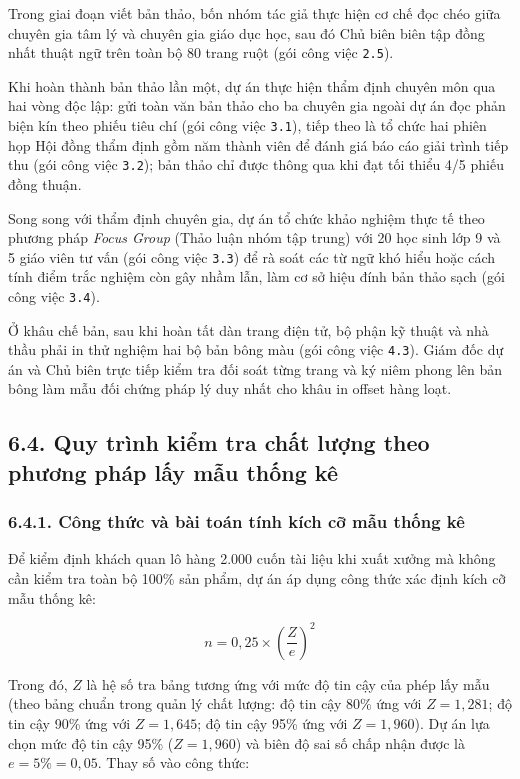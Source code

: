 Trong giai đoạn viết bản thảo, bốn nhóm tác giả thực hiện cơ chế đọc chéo giữa chuyên gia tâm lý và chuyên gia giáo dục học, sau đó Chủ biên biên tập đồng nhất thuật ngữ trên toàn bộ 80 trang ruột (gói công việc \texttt{2.5}).

Khi hoàn thành bản thảo lần một, dự án thực hiện thẩm định chuyên môn qua hai vòng độc lập: gửi toàn văn bản thảo cho ba chuyên gia ngoài dự án đọc phản biện kín theo phiếu tiêu chí (gói công việc \texttt{3.1}), tiếp theo là tổ chức hai phiên họp Hội đồng thẩm định gồm năm thành viên để đánh giá báo cáo giải trình tiếp thu (gói công việc \texttt{3.2}); bản thảo chỉ được thông qua khi đạt tối thiểu 4/5 phiếu đồng thuận.

Song song với thẩm định chuyên gia, dự án tổ chức khảo nghiệm thực tế theo phương pháp \textit{Focus Group} (Thảo luận nhóm tập trung) với 20 học sinh lớp 9 và 5 giáo viên tư vấn (gói công việc \texttt{3.3}) để rà soát các từ ngữ khó hiểu hoặc cách tính điểm trắc nghiệm còn gây nhầm lẫn, làm cơ sở hiệu đính bản thảo sạch (gói công việc \texttt{3.4}).

Ở khâu chế bản, sau khi hoàn tất dàn trang điện tử, bộ phận kỹ thuật và nhà thầu phải in thử nghiệm hai bộ bản bông màu (gói công việc \texttt{4.3}). Giám đốc dự án và Chủ biên trực tiếp kiểm tra đối soát từng trang và ký niêm phong lên bản bông làm mẫu đối chứng pháp lý duy nhất cho khâu in offset hàng loạt.

\subsection{6.4. Quy trình kiểm tra chất lượng theo phương pháp lấy mẫu thống kê}

\subsubsection{6.4.1. Công thức và bài toán tính kích cỡ mẫu thống kê}

Để kiểm định khách quan lô hàng 2.000 cuốn tài liệu khi xuất xưởng mà không cần kiểm tra toàn bộ 100\% sản phẩm, dự án áp dụng công thức xác định kích cỡ mẫu thống kê:

\begin{equation}
n = 0,25 \times \left(\frac{Z}{e}\right)^2
\end{equation}

Trong đó, $Z$ là hệ số tra bảng tương ứng với mức độ tin cậy của phép lấy mẫu (theo bảng chuẩn trong quản lý chất lượng: độ tin cậy 80\% ứng với $Z = 1,281$; độ tin cậy 90\% ứng với $Z = 1,645$; độ tin cậy 95\% ứng với $Z = 1,960$). Dự án lựa chọn mức độ tin cậy 95\% ($Z = 1,960$) và biên độ sai số chấp nhận được là $e = 5\% = 0,05$. Thay số vào công thức:


